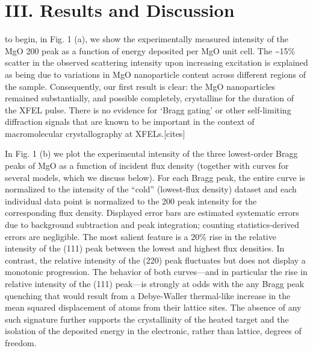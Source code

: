 \section{III. Results and Discussion}

to begin, in Fig. 1 (a), we show the experimentally measured intensity
of the MgO 200 peak as a function of energy deposited per MgO unit cell.
The \textasciitilde{}15\% scatter in the observed scattering intensity
upon increasing excitation is explained as being due to variations in
MgO nanoparticle content across different regions of the sample.
Consequently, our first result is clear: the MgO nanoparticles remained
substantially, and possible completely, crystalline for the duration of
the XFEL pulse. There is no evidence for `Bragg gating' or other
self-limiting diffraction signals that are known to be important in the
context of macromolecular crystallography at XFELs.{[}cites{]}

In Fig. 1 (b) we plot the experimental intensity of the three
lowest-order Bragg peaks of MgO as a function of incident flux density
(together with curves for several models, which we discuss below). For
each Bragg peak, the entire curve is normalized to the intensity of the
``cold'' (lowest-flux density) dataset and each individual data point is
normalized to the 200 peak intensity for the corresponding flux density.
Displayed error bars are estimated systematic errors due to background
subtraction and peak integration; counting statistics-derived errors are
negligible. The most salient feature is a 20\% rise in the relative
intensity of the (111) peak between the lowest and highest flux
densities. In contrast, the relative intensity of the (220) peak
fluctuates but does not display a monotonic progression. The behavior of
both curves---and in particular the rise in relative intensity of the
(111) peak---is strongly at odds with the any Bragg peak quenching that
would result from a Debye-Waller thermal-like increase in the mean
squared displacement of atoms from their lattice sites. The absence of
any such signature further supports the crystallinity of the heated
target and the isolation of the deposited energy in the electronic,
rather than lattice, degrees of freedom.

